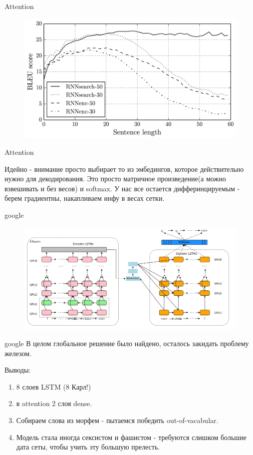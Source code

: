 \documentclass[notes,12pt, aspectratio=169]{beamer}
\begin{document}
\begin{frame}{Attention}

\begin{figure}
	\centering
	\includegraphics[width=1\linewidth]{images/bahdanau_attn}
	\label{fig:seq2seq}
\end{figure}
\end{frame}


\begin{frame}{Attention}

Идейно - внимание просто выбирает то из эмбедингов, которое действительно нужно для декодирования.
Это просто матричное произведение(а можно взвешивать и без весов) и softmax. У нас все остается дифферинцируемым - берем градиентны, накапливаем инфу в весах сетки. 
\end{frame}

\begin{frame}{google}
\begin{figure}
	\centering
	\includegraphics[width=1\linewidth]{images/google_neural_first}
	\label{fig:seq2seq}
\end{figure}
\end{frame}


\begin{frame}{google}
В целом глобальное решение было найдено, осталось закидать проблему железом.

Выводы:
\begin{enumerate}
	\item 8 слоев LSTM (8 Карл!)
	\item в attention 2 слоя dense. 
	\item Собираем слова из морфем - пытаемся победить out-of-vacabular.
	\item Модель стала иногда сексистом и фашистом - требуются слишком большие дата сеты, чтобы учить эту большую прелесть.
\end{enumerate}
\end{frame}
\end{document}
